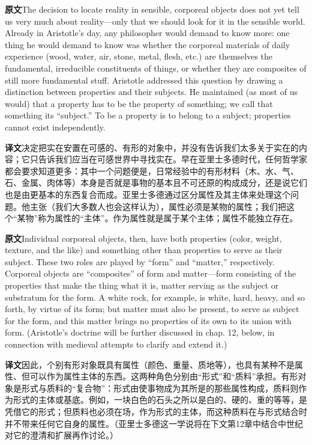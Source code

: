 \documentclass[UTF8,zihao=-4]{ctexart}
\newcommand{\BodyFont}{\fontsize{10.5pt}{15.5pt}\selectfont}
\newcommand{\origlabel}{\textbf{原文}\quad}
\newcommand{\translabel}{\textbf{译文}\quad}
\newcommand{\orig}{\par\noindent\begingroup\BodyFont\origlabel}
\newcommand{\zhline}[1]{\par\endgroup\noindent\begingroup\BodyFont\translabel #1\par\endgroup\vspace{0.35em}}
\begin{document}
\orig The decision to locate reality in sensible, corporeal objects does not yet tell us very much about reality---only that we should look for it in the sensible world. Already in Aristotle's day, any philosopher would demand to know more: one thing he would demand to know was whether the corporeal materials of daily experience (wood, water, air, stone, metal, flesh, etc.) are themselves the fundamental, irreducible constituents of things, or whether they are composites of still more fundamental stuff. Aristotle addressed this question by drawing a distinction between properties and their subjects. He maintained (as most of us would) that a property has to be the property of something; we call that something its ``subject.'' To be a property is to belong to a subject; properties cannot exist independently.

\zhline{决定把实在安置在可感的、有形的对象中，并没有告诉我们太多关于实在的内容；它只告诉我们应当在可感世界中寻找实在。早在亚里士多德时代，任何哲学家都会要求知道更多：其中一个问题便是，日常经验中的有形材料（木、水、气、石、金属、肉体等）本身是否就是事物的基本且不可还原的构成成分，还是说它们也是由更基本的东西复合而成。亚里士多德通过区分属性及其主体来处理这个问题。他主张（我们大多数人也会这样认为），属性必须是某物的属性；我们把这个“某物”称为属性的“主体”。作为属性就是属于某个主体；属性不能独立存在。}

\orig Individual corporeal objects, then, have both properties (color, weight, texture, and the like) and something other than properties to serve as their subject. These two roles are played by ``form'' and ``matter,'' respectively. Corporeal objects are ``composites'' of form and matter---form consisting of the properties that make the thing what it is, matter serving as the subject or substratum for the form. A white rock, for example, is white, hard, heavy, and so forth, by virtue of its form; but matter must also be present, to serve as subject for the form, and this matter brings no properties of its own to its union with form. (Aristotle's doctrine will be further discussed in chap. 12, below, in connection with medieval attempts to clarify and extend it.)

\zhline{因此，个别有形对象既具有属性（颜色、重量、质地等），也具有某种不是属性、但可以作为属性主体的东西。这两种角色分别由“形式”和“质料”承担。有形对象是形式与质料的“复合物”：形式由使事物成为其所是的那些属性构成，质料则作为形式的主体或基底。例如，一块白色的石头之所以是白的、硬的、重的等等，是凭借它的形式；但质料也必须在场，作为形式的主体，而这种质料在与形式结合时并不带来任何它自身的属性。（亚里士多德这一学说将在下文第12章中结合中世纪对它的澄清和扩展再作讨论。）}
\end{document}
